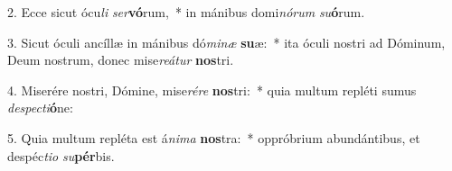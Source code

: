 2. Ecce sicut ócu\textit{li} \textit{ser}\textbf{vó}rum,~*  in mánibus domi\textit{nó}\textit{rum} \textit{su}\textbf{ó}rum.\

3. Sicut óculi ancíllæ in mánibus dó\textit{mi}\textit{næ} \textbf{su}æ:~*  ita óculi nostri ad Dóminum, Deum nostrum, donec mise\textit{re}\textit{á}\textit{tur} \textbf{nos}tri.\

4. Miserére nostri, Dómine, mise\textit{ré}\textit{re} \textbf{nos}tri:~*  quia multum repléti sumus \textit{de}\textit{spec}\textit{ti}\textbf{ó}ne:\

5. Quia multum repléta est á\textit{ni}\textit{ma} \textbf{nos}tra:~*  oppróbrium abundántibus, et despéc\textit{ti}\textit{o} \textit{su}\textbf{pér}bis.\

